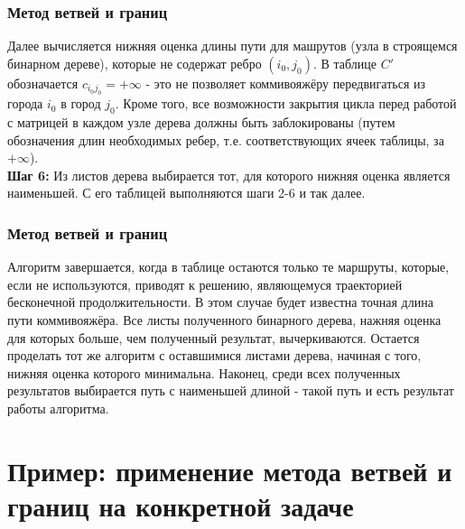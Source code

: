 \documentclass{beamer}
\begin{document}
\begin{frame}
\frametitle{Метод ветвей и границ}
Далее вычисляется нижняя оценка длины пути для машрутов (узла в строящемся бинарном дереве), которые не содержат ребро $(i_0, j_0)$. В таблице $C'$ обозначается $c_{i_0j_0} = +\infty$ - это не позволяет коммивояжёру передвигаться из города $i_0$ в город $j_0$. Кроме того, все возможности закрытия цикла перед работой с матрицей в каждом узле дерева должны быть заблокированы (путем обозначения длин необходимых ребер, т.е. соответствующих ячеек таблицы, за $+\infty$).\\
\textbf{Шаг 6:} Из листов дерева выбирается тот, для которого нижняя оценка является наименьшей. С его таблицей выполняются шаги 2-6 и так далее.
\end{frame}

\begin{frame}
\frametitle{Метод ветвей и границ}
Алгоритм завершается, когда в таблице остаются только те маршруты, которые, если не
используются, приводят к решению, являющемуся траекторией бесконечной
продолжительности. В этом случае будет известна точная длина пути коммивояжёра. Все листы полученного бинарного дерева, нажняя оценка для которых больше, чем полученный результат, вычеркиваются. Остается проделать тот же алгоритм с оставшимися листами дерева, начиная с того, нижняя оценка которого минимальна. Наконец, среди всех полученных результатов выбирается путь с наименьшей длиной - такой путь и есть результат работы алгоритма. 
\end{frame}


\section{Пример: применение метода ветвей и границ на конкретной задаче}

\end{document}

